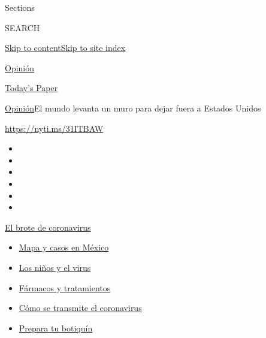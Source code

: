 Sections

SEARCH

\protect\hyperlink{site-content}{Skip to
content}\protect\hyperlink{site-index}{Skip to site index}

\href{https://www.nytimes.com/es/section/opinion}{Opinión}

\href{https://myaccount.nytimes.com/auth/login?response_type=cookie\&client_id=vi}{}

\href{https://www.nytimes.com/section/todayspaper}{Today's Paper}

\href{/es/section/opinion}{Opinión}\textbar{}El mundo levanta un muro
para dejar fuera a Estados Unidos

\href{https://nyti.ms/31ITBAW}{https://nyti.ms/31ITBAW}

\begin{itemize}
\item
\item
\item
\item
\item
\item
\end{itemize}

\href{https://www.nytimes.com/es/spotlight/coronavirus?action=click\&pgtype=Article\&state=default\&region=TOP_BANNER\&context=storylines_menu}{El
brote de coronavirus}

\begin{itemize}
\tightlist
\item
  \href{https://www.nytimes.com/es/interactive/2020/espanol/america-latina/coronavirus-en-mexico.html?action=click\&pgtype=Article\&state=default\&region=TOP_BANNER\&context=storylines_menu}{Mapa
  y casos en México}
\item
  \href{https://www.nytimes.com/es/2020/07/31/espanol/ciencia-y-tecnologia/ninos-contagio-coronavirus.html?action=click\&pgtype=Article\&state=default\&region=TOP_BANNER\&context=storylines_menu}{Los
  niños y el virus}
\item
  \href{https://www.nytimes.com/es/interactive/2020/science/coronavirus-tratamientos-curas.html?action=click\&pgtype=Article\&state=default\&region=TOP_BANNER\&context=storylines_menu}{Fármacos
  y tratamientos}
\item
  \href{https://www.nytimes.com/es/2020/07/06/espanol/ciencia-y-tecnologia/coronavirus-transmision-aire.html?action=click\&pgtype=Article\&state=default\&region=TOP_BANNER\&context=storylines_menu}{Cómo
  se transmite el coronavirus}
\item
  \href{https://www.nytimes.com/es/2020/07/14/espanol/estilos-de-vida/botiquin-medicina-coronavirus.html?action=click\&pgtype=Article\&state=default\&region=TOP_BANNER\&context=storylines_menu}{Prepara
  tu botiquín}
\end{itemize}

